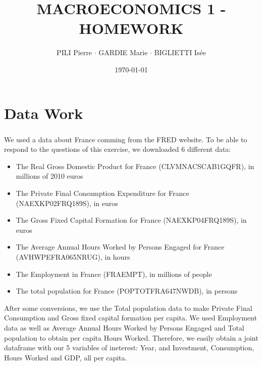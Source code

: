 \documentclass[12pt]{article}
\title{MACROECONOMICS 1 - HOMEWORK}
\author{PILI Pierre $\cdot$ GARDIE Marie $\cdot$ BIGLIETTI Isée}
\date{\today}
\begin{document}
\maketitle
\section{Data Work}
\subsubsection*{}
We used a data about France comming from the FRED website. To be able to respond to the questions of this exercise, we downloaded 6 different data: 
\begin{itemize}
    \item The Real Gross Domestic Product for France (CLVMNACSCAB1GQFR), in millions of 2010 euros
    \item The Private Final Consumption Expenditure for France (NAEXKP02FRQ189S), in euros
    \item The Gross Fixed Capital Formation for France (NAEXKP04FRQ189S), in euros
    \item The Average Annual Hours Worked by Persons Engaged for France (AVHWPEFRA065NRUG), in hours
    \item The Employment in France (FRAEMPT), in millions of people
    \item The total population for France (POPTOTFRA647NWDB), in persons
\end{itemize}
After some conversions, we use the Total population data to make Private Final Consumption and Gross fixed capital formation per capita.
We used Employment data as well as Average Annual Hours Worked by Persons Engaged and Total population to obtain per capita Hours Worked. 
Therefore, we easily obtain a joint dataframe with our 5 variables of ineterest: Year, and Investment, Consumption, Hours Worked and GDP, all per capita.
\end{document}
